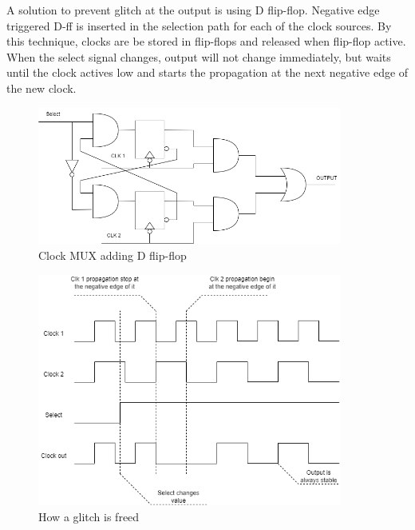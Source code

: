 \documentclass[a4paper, 12pt]{report}
\begin{document}
A solution to prevent glitch at the output is using D flip-flop. Negative edge triggered D-ff is inserted in the selection path for each of the clock sources. By this technique, clocks are be stored in flip-flops and released when flip-flop active. When the select signal changes, output will not change immediately, but waits until the clock actives low and starts the propagation at the next negative edge of the new clock.
\begin{center} 
    \begin{figure}[H]
        \begin{center}
            \includegraphics[width=10cm]{picture/clock mux/clock mux-Page-3.drawio.png}
        \end{center}
        \caption{Clock MUX adding D flip-flop}
        \label{ref Figure}
    \end{figure}
\end{center}

\begin{center} 
    \begin{figure}[H]
        \begin{center}
            \includegraphics[width=10cm]{picture/clock mux/clock mux-Page-4.drawio.png}
        \end{center}
        \caption{How a glitch is freed}
        \label{ref Figure}
    \end{figure}
\end{center}
\end{document}
